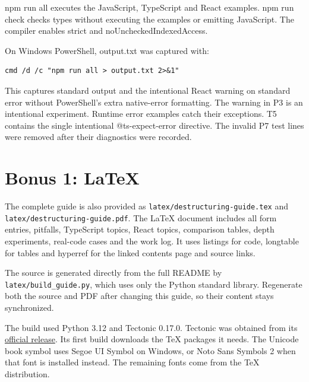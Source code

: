 \documentclass[10pt,a4paper]{article}
\begin{document}
npm run all executes the JavaScript, TypeScript and React examples. npm run check checks types without executing the examples or emitting JavaScript. The compiler enables strict and noUncheckedIndexedAccess.


On Windows PowerShell, output.txt was captured with:

\begin{lstlisting}[language={}]
cmd /d /c "npm run all > output.txt 2>&1"
\end{lstlisting}

This captures standard output and the intentional React warning on standard error without PowerShell's extra native-error formatting. The warning in P3 is an intentional experiment. Runtime error examples catch their exceptions. T5 contains the single intentional @ts-expect-error directive. The invalid P7 test lines were removed after their diagnostics were recorded.

\section{Bonus 1: LaTeX}

The complete guide is also provided as \texttt{latex/\allowbreak{}destructuring-guide.\allowbreak{}tex} and \texttt{latex/\allowbreak{}destructuring-guide.\allowbreak{}pdf}. The LaTeX document includes all form entries, pitfalls, TypeScript topics, React topics, comparison tables, depth experiments, real-code cases and the work log. It uses listings for code, longtable for tables and hyperref for the linked contents page and source links.

The source is generated directly from the full README by \texttt{latex/\allowbreak{}build\_\allowbreak{}guide.\allowbreak{}py}, which uses only the Python standard library. Regenerate both the source and PDF after changing this guide, so their content stays synchronized.

The build used Python 3.12 and Tectonic 0.17.0. Tectonic was obtained from its \href{https://github.com/tectonic-typesetting/tectonic/releases/tag/tectonic\%400.17.0}{official release}. Its first build downloads the TeX packages it needs. The Unicode book symbol uses Segoe UI Symbol on Windows, or Noto Sans Symbols 2 when that font is installed instead. The remaining fonts come from the TeX distribution.

\end{document}
